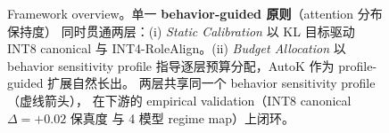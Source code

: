 \begin{figure}[!htbp]
\begin{tikzpicture}
  \end{tikzpicture}
  \caption{Framework overview。单一 \textbf{behavior-guided 原则}（attention 分布保持度）
  同时贯通两层：(i) \emph{Static Calibration} 以 KL 目标驱动 INT8 canonical
  与 INT4-RoleAlign。(ii) \emph{Budget Allocation} 以 behavior sensitivity profile
  指导逐层预算分配，AutoK 作为 profile-guided 扩展自然长出。
  两层共享同一个 behavior sensitivity profile（虚线箭头），
  在下游的 empirical validation（INT8 canonical $\Delta{=}{+}0.02$ 保真度
  与 4 模型 regime map）上闭环。}
  \label{fig:framework-overview}
\end{figure}
